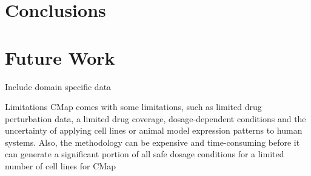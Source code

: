 \documentclass[bsc,frontabs,twoside,singlespacing,parskip,deptreport]{infthesis}     %
\begin{document}
\chapter{Conclusions}

\chapter{Future Work}
Include domain specific data

Limitations
CMap comes with some limitations, such as limited drug perturbation data, a limited drug coverage, dosage-dependent conditions and the uncertainty of applying cell lines or animal model expression patterns to human systems. Also, the methodology can be expensive and time-consuming before it can generate a significant portion of all safe dosage conditions for a limited number of cell lines for CMap



\end{document}
